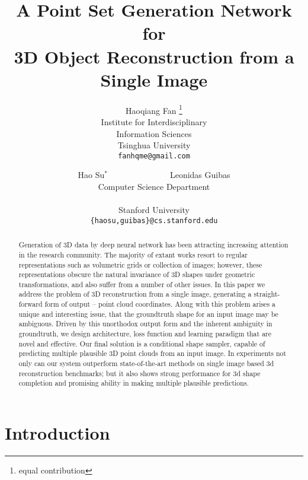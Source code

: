 \documentclass[10pt,twocolumn,letterpaper]{article}
\begin{document}
\title{A Point Set Generation Network for \\ 3D Object Reconstruction from a Single Image}

\author{Haoqiang Fan \thanks{equal contribution} \\
Institute for Interdisciplinary\\ Information Sciences\\
Tsinghua University\\
{\tt\small fanhqme@gmail.com}
\and
Hao Su${}^*$~~~~~~~~~~~~~~~Leonidas Guibas\\
Computer Science Department\\
\\
Stanford University\\
{\tt\small \{haosu,guibas\}@cs.stanford.edu}
}

\maketitle

\begin{abstract}
  Generation of 3D data by deep neural network has been attracting increasing attention in the research community. The majority of extant works resort to regular representations such as volumetric grids or collection of images; however, these representations obscure the natural invariance of 3D shapes under geometric transformations, and also suffer from a number of other issues.
In this paper we address the problem of 3D reconstruction from a single image, generating a straight-forward form of output -- point cloud coordinates. Along with this problem arises a unique and interesting issue, that the groundtruth shape for an input image may be ambiguous. Driven by this unorthodox output form and the inherent ambiguity in groundtruth, we design architecture, loss function and learning paradigm that are novel and effective. Our final solution is a conditional shape sampler, capable of predicting multiple plausible 3D point clouds from an input image.
In experiments not only can our system outperform state-of-the-art methods on single image based 3d reconstruction benchmarks; but it also shows strong performance for 3d shape completion and promising ability in making multiple plausible predictions.
\end{abstract}

\section{Introduction}
\label{sec:intro}%
\end{document}

